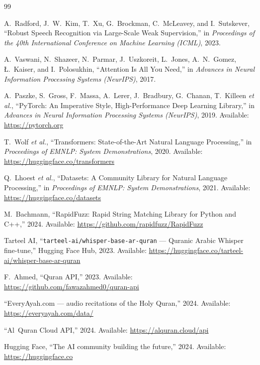 \begin{thebibliography}{99}

A.~Radford, J.~W.~Kim, T.~Xu, G.~Brockman, C.~McLeavey, and I.~Sutskever,
``Robust Speech Recognition via Large-Scale Weak Supervision,''
in \textit{Proceedings of the 40th International Conference on Machine
Learning (ICML)}, 2023.

A.~Vaswani, N.~Shazeer, N.~Parmar, J.~Uszkoreit, L.~Jones, A.~N.~Gomez,
{\L}.~Kaiser, and I.~Polosukhin,
``Attention Is All You Need,''
in \textit{Advances in Neural Information Processing Systems (NeurIPS)},
2017.

A.~Paszke, S.~Gross, F.~Massa, A.~Lerer, J.~Bradbury, G.~Chanan,
T.~Killeen \textit{et al.},
``PyTorch: An Imperative Style, High-Performance Deep Learning Library,''
in \textit{Advances in Neural Information Processing Systems (NeurIPS)},
2019. Available: \url{https://pytorch.org}

T.~Wolf \textit{et al.},
``Transformers: State-of-the-Art Natural Language Processing,''
in \textit{Proceedings of EMNLP: System Demonstrations}, 2020.
Available: \url{https://huggingface.co/transformers}

Q.~Lhoest \textit{et al.},
``Datasets: A Community Library for Natural Language Processing,''
in \textit{Proceedings of EMNLP: System Demonstrations}, 2021.
Available: \url{https://huggingface.co/datasets}

M.~Bachmann,
``RapidFuzz: Rapid String Matching Library for Python and C++,''
2024. Available: \url{https://github.com/rapidfuzz/RapidFuzz}

Tarteel AI,
``\texttt{tarteel-ai/whisper-base-ar-quran} --- Quranic Arabic Whisper
fine-tune,'' Hugging Face Hub, 2023.
Available: \url{https://huggingface.co/tarteel-ai/whisper-base-ar-quran}

F.~Ahmed, ``Quran API,'' 2023.
Available: \url{https://github.com/fawazahmed0/quran-api}

``EveryAyah.com --- audio recitations of the Holy Quran,'' 2024.
Available: \url{https://everyayah.com/data/}

``Al~Quran Cloud API,'' 2024.
Available: \url{https://alquran.cloud/api}

Hugging Face,
``The AI community building the future,'' 2024.
Available: \url{https://huggingface.co}


\end{thebibliography}
